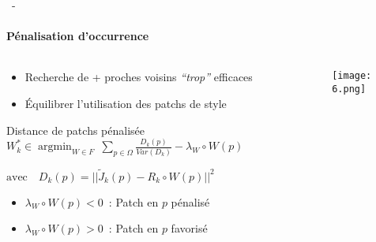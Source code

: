 \documentclass[aspectratio=169, 22pt]{beamer}
\DeclareMathOperator*{\argmin}{argmin}
\begin{document}
\begin{frame}{\secname~- \subsecname}
  \framesubtitle{Pénalisation d'occurrence}
  \begin{columns}
    \begin{column}{0.5\linewidth}
        \begin{itemize}
        \item Recherche de + proches voisins \emph{``trop''} efficaces
        \item Équilibrer l'utilisation des patchs de style
        \end{itemize}

      \begin{block}{Distance de patchs pénalisée}
        \centering
        \small
        $W_k^* \in \argmin_{W \in F}\ \sum_{p \in \Omega} \frac{D_k(p)}{Var(D_k)} - \lambda_W \circ W(p)$
        
        $\text{avec} \quad D_k(p) = ||\tilde{J}_k(p) - R_k \circ W(p)||^2$
      \end{block}
      \begin{itemize}
      \item $\lambda_W \circ W(p) < 0$~: Patch en $p$ pénalisé
      \item $\lambda_W \circ W(p) > 0$~: Patch en $p$ favorisé
      \end{itemize}
    \end{column}
    \begin{column}{0.5\linewidth}
      \begin{figure}
        \centering
        \texttt{[image: 6.png]}
      \end{figure}
    \end{column}
  \end{columns}
\end{frame}
\end{document}

